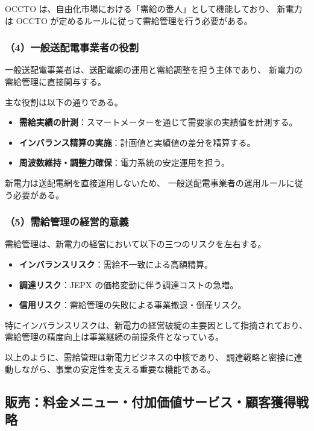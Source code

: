 OCCTO は、自由化市場における「需給の番人」として機能しており、
新電力は OCCTO が定めるルールに従って需給管理を行う必要がある。

\subsubsection{（4）一般送配電事業者の役割}

一般送配電事業者は、送配電網の運用と需給調整を担う主体であり、
新電力の需給管理に直接関与する。

主な役割は以下の通りである。

\begin{itemize}
  \item \textbf{需給実績の計測}：スマートメーターを通じて需要家の実績値を計測する。
  \item \textbf{インバランス精算の実施}：計画値と実績値の差分を精算する。
  \item \textbf{周波数維持・調整力確保}：電力系統の安定運用を担う。
\end{itemize}

新電力は送配電網を直接運用しないため、
一般送配電事業者の運用ルールに従う必要がある。

\subsubsection{（5）需給管理の経営的意義}

需給管理は、新電力の経営において以下の三つのリスクを左右する。

\begin{itemize}
  \item \textbf{インバランスリスク}：需給不一致による高額精算。
  \item \textbf{調達リスク}：JEPX の価格変動に伴う調達コストの急増。
  \item \textbf{信用リスク}：需給管理の失敗による事業撤退・倒産リスク。
\end{itemize}

特にインバランスリスクは、新電力の経営破綻の主要因として指摘されており、
需給管理の精度向上は事業継続の前提条件となっている。

以上のように、需給管理は新電力ビジネスの中核であり、
調達戦略と密接に連動しながら、事業の安定性を支える重要な機能である。

\subsection{販売：料金メニュー・付加価値サービス・顧客獲得戦略}

